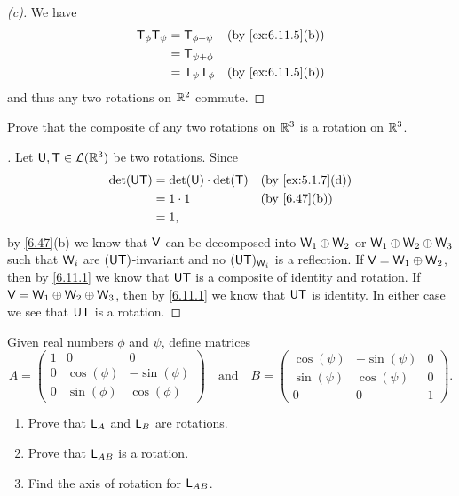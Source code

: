 \begin{proof}[(c)]
  We have
  \begin{align*}
    \T_{\phi} \T_{\psi} & = \T_{\phi + \psi}    &  & \by{ex:6.11.5}[b] \\
                        & = \T_{\psi + \phi}                           \\
                        & = \T_{\psi} \T_{\phi} &  & \by{ex:6.11.5}[b]
  \end{align*}
  and thus any two rotations on \(\mathbb{R}^2\) commute.
\end{proof}

\begin{ex}\label{ex:6.11.6}
  Prove that the composite of any two rotations on \(\mathbb{R}^3\) is a rotation on \(\mathbb{R}^3\).
\end{ex}

\begin{proof}[]
  Let \(\mathsf{U}, \mathsf{T} \in \mathcal{L}(\mathbb{R}^3)\) be two rotations.
  Since
  \begin{align*}
    \det(\U \T) & = \det(\U) \cdot \det(\T) &  & \by{ex:5.1.7}[d] \\
                & = 1 \cdot 1               &  & \by{6.47}[b]     \\
                & = 1,
  \end{align*}
  by \cref{6.47}(b) we know that \(\mathsf{V}\) can be decomposed into \(\mathsf{W}_1 \oplus \mathsf{W}_2\) or \(\mathsf{W}_1 \oplus \mathsf{W}_2 \oplus \mathsf{W}_3\) such that \(\mathsf{W}_i\) are \((\mathsf{U} \mathsf{T})\)-invariant and no \((\mathsf{U} \mathsf{T})_{\mathsf{W}_i}\) is a reflection.
  If \(\mathsf{V} = \mathsf{W}_1 \oplus \mathsf{W}_2\), then by \cref{6.11.1} we know that \(\mathsf{U} \mathsf{T}\) is a composite of identity and rotation.
  If \(\mathsf{V} = \mathsf{W}_1 \oplus \mathsf{W}_2 \oplus \mathsf{W}_3\), then by \cref{6.11.1} we know that \(\mathsf{U} \mathsf{T}\) is identity.
  In either case we see that \(\mathsf{U} \mathsf{T}\) is a rotation.
\end{proof}

\begin{ex}\label{ex:6.11.7}
  Given real numbers \(\phi\) and \(\psi\), define matrices
  \[
    A = \begin{pmatrix}
      1 & 0          & 0           \\
      0 & \cos(\phi) & -\sin(\phi) \\
      0 & \sin(\phi) & \cos(\phi)
    \end{pmatrix} \quad \text{and} \quad B = \begin{pmatrix}
      \cos(\psi) & -\sin(\psi) & 0 \\
      \sin(\psi) & \cos(\psi)  & 0 \\
      0          & 0           & 1
    \end{pmatrix}.
  \]
  \begin{enumerate}
    \item Prove that \(\mathsf{L}_{A}\) and \(\mathsf{L}_{B}\) are rotations.
    \item Prove that \(\mathsf{L}_{AB}\) is a rotation.
    \item Find the axis of rotation for \(\mathsf{L}_{AB}\).
  \end{enumerate}
\end{ex}

